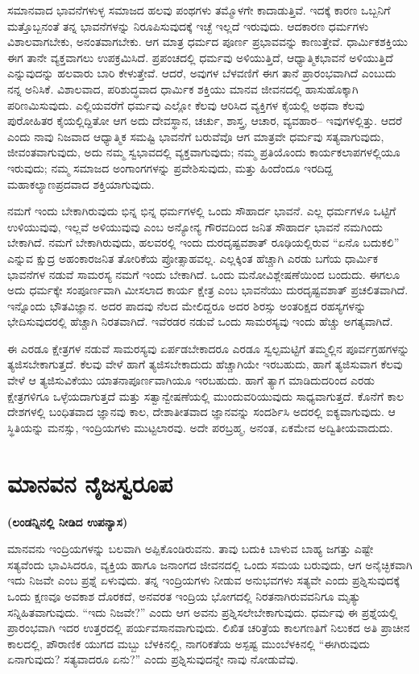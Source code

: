 ಸಮಾನವಾದ ಭಾವನೆಗಳುಳ್ಳ ಸಮಾಜದ ಹಲವು ಪಂಥಗಳು ತಮ್ಮೊಳಗೇ ಕಾದಾಡುತ್ತಿವೆ. ಇದಕ್ಕೆ ಕಾರಣ ಒಬ್ಬನಿಗೆ ಮತ್ತೊಬ್ಬನಂತೆ ತನ್ನ ಭಾವನೆಗಳನ್ನು ನಿರೂಪಿಸುವುದಕ್ಕೆ ಇಚ್ಛೆ ಇಲ್ಲದೆ ಇರುವುದು. ಆದಕಾರಣ ಧರ್ಮಗಳು ವಿಶಾಲವಾಗಬೇಕು, ಅನಂತವಾಗಬೇಕು. ಆಗ ಮಾತ್ರ ಧರ್ಮದ ಪೂರ್ಣ ಪ್ರಭಾವವನ್ನು ಕಾಣುತ್ತೇವೆ. ಧಾರ್ಮಿಕಶಕ್ತಿಯು ಈಗ ತಾನೇ ವ್ಯಕ್ತವಾಗಲು ಉಪಕ್ರಮಿಸಿದೆ. ಪ್ರಪಂಚದಲ್ಲಿ ಧರ್ಮವು ಅಳಿಯುತ್ತಿದೆ, ಆಧ್ಯಾತ್ಮಿಕಭಾವನೆ ಅಳಿಯುತ್ತಿದೆ ಎನ್ನುವುದನ್ನು ಹಲವಾರು ಬಾರಿ ಕೇಳುತ್ತೇವೆ. ಆದರೆ, ಅವುಗಳ ಬೆಳವಣಿಗೆ ಈಗ ತಾನೆ ಪ್ರಾರಂಭವಾಗಿದೆ ಎಂಬುದು ನನ್ನ ಅನಿಸಿಕೆ. ವಿಶಾಲವಾದ, ಪರಿಶುದ್ಧವಾದ ಧಾರ್ಮಿಕ ಶಕ್ತಿಯು ಮಾನವ ಜೀವನದಲ್ಲಿ ಹಾಸುಹೊಕ್ಕಾಗಿ ಪರಿಣಮಿಸುವುದು. ಎಲ್ಲಿಯವರೆಗೆ ಧರ್ಮವು ಎಲ್ಲೋ ಕೆಲವು ಆರಿಸಿದ ವ್ಯಕ್ತಿಗಳ ಕೈಯಲ್ಲಿ ಅಥವಾ ಕೆಲವು ಪುರೋಹಿತರ ಕೈಯಲ್ಲಿದ್ದಿತೋ ಆಗ ಅದು ದೇವಸ್ಥಾನ, ಚರ್ಚು, ಶಾಸ್ತ್ರ, ಆಚಾರ, ವ್ಯವಹಾರ– ಇವುಗಳಲ್ಲಿತ್ತು. ಆದರೆ ಎಂದು ನಾವು ನಿಜವಾದ ಆಧ್ಯಾತ್ಮಿಕ ಸಮಷ್ಟಿ ಭಾವನೆಗೆ ಬರುವೆವೊ ಆಗ ಮಾತ್ರವೇ ಧರ್ಮವು ಸತ್ಯವಾಗುವುದು, ಜೀವಂತವಾಗುವುದು, ಅದು ನಮ್ಮ ಸ್ವಭಾವದಲ್ಲಿ ವ್ಯಕ್ತವಾಗುವುದು; ನಮ್ಮ ಪ್ರತಿಯೊಂದು ಕಾರ್ಯಕಲಾಪಗಳಲ್ಲಿಯೂ ಇರುವುದು; ನಮ್ಮ ಸಮಾಜದ ಅಂಗಾಂಗಗಳನ್ನು ಪ್ರವೇಶಿಸುವುದು, ಮತ್ತು ಹಿಂದೆಂದೂ ಇರದಿದ್ದ ಮಹಾಕಲ್ಯಾಣಪ್ರದವಾದ ಶಕ್ತಿಯಾಗುವುದು.

ನಮಗೆ ಇಂದು ಬೇಕಾಗಿರುವುದು ಭಿನ್ನ ಭಿನ್ನ ಧರ್ಮಗಳಲ್ಲಿ ಒಂದು ಸೌಹಾರ್ದ ಭಾವನೆ. ಎಲ್ಲ ಧರ್ಮಗಳೂ ಒಟ್ಟಿಗೆ ಉಳಿಯುವುವು, ಇಲ್ಲವೆ ಅಳಿಯುವುವು ಎಂಬ ಅನ್ಯೋನ್ಯ ಗೌರವದಿಂದ ಜನಿತ ಸೌಹಾರ್ದ ಭಾವನೆ ನಮಗಿಂದು ಬೇಕಾಗಿದೆ. ನಮಗೆ ಬೇಕಾಗಿರುವುದು, ಹಲವರಲ್ಲಿ ಇಂದು ದುರದೃಷ್ಟವಶಾತ್​ ರೂಢಿಯಲ್ಲಿರುವ “ಏನೊ ಬದುಕಲಿ” ಎನ್ನುವ ಕ್ಷುದ್ರ ಅಹಂಕಾರಜನಿತ ತೋರಿಕೆಯ ಪ್ರೋತ್ಸಾಹವಲ್ಲ. ಎಲ್ಲಕ್ಕಿಂತ ಹೆಚ್ಚಾಗಿ ಎರಡು ಬಗೆಯ ಧಾರ್ಮಿಕ ಭಾವನೆಗಳ ನಡುವೆ ಸಾಮರಸ್ಯ ನಮಗೆ ಇಂದು ಬೇಕಾಗಿದೆ. ಒಂದು ಮನೋವಿಶ್ಲೇಷಣೆಯಿಂದ ಬಂದುದು. ಈಗಲೂ ಅದು ಧರ್ಮಕ್ಕೇ ಸಂಪೂರ್ಣವಾಗಿ ಮೀಸಲಾದ ಕಾರ್ಯ ಕ್ಷೇತ್ರ ಎಂಬ ಭಾವನೆಯು ದುರದೃಷ್ಟವಶಾತ್​ ಪ್ರಚಲಿತವಾಗಿದೆ. ಇನ್ನೊಂದು ಭೌತವಿಜ್ಞಾನ. ಅದರ ಪಾದವು ನೆಲದ ಮೇಲಿದ್ದರೂ ಅದರ ಶಿರಸ್ಸು ಅಂತರಿಕ್ಷದ ರಹಸ್ಯಗಳನ್ನು ಭೇದಿಸುವುದರಲ್ಲಿ ಹೆಚ್ಚಾಗಿ ನಿರತವಾಗಿದೆ. ಇವೆರಡರ ನಡುವೆ ಒಂದು ಸಾಮರಸ್ಯವು ಇಂದು ಹೆಚ್ಚು ಅಗತ್ಯವಾಗಿದೆ.

ಈ ಎರಡೂ ಕ್ಷೇತ್ರಗಳ ನಡುವೆ ಸಾಮರಸ್ಯವು ಏರ್ಪಡಬೇಕಾದರೂ ಎರಡೂ ಸ್ವಲ್ಪಮಟ್ಟಿಗೆ ತಮ್ಮಲ್ಲಿನ ಪೂರ್ವಗ್ರಹಗಳನ್ನು ತ್ಯಜಿಸಬೇಕಾಗುತ್ತದೆ. ಕೆಲವು ವೇಳೆ ಹಾಗೆ ತ್ಯಜಿಸಬೇಕಾದುದು ಹೆಚ್ಚಾಗಿಯೇ ಇರಬಹುದು, ಹಾಗೆ ತ್ಯಜಿಸುವಾಗ ಕೆಲವು ವೇಳೆ ಆ ತ್ಯಜಿಸುವಿಕೆಯು ಯಾತನಾಪೂರ್ಣವಾಗಿಯೂ ಇರಬಹುದು. ಹಾಗೆ ತ್ಯಾಗ ಮಾಡಿದುದರಿಂದ ಎರಡು ಕ್ಷೇತ್ರಗಳಿಗೂ ಒಳ್ಳೆಯದಾಗುತ್ತದೆ ಮತ್ತು ಸತ್ವಾನ್ವೇಷಣೆಯಲ್ಲಿ ಮುಂದುವರಿಯುವುದು ಸಾಧ್ಯವಾಗುತ್ತದೆ. ಕೊನೆಗೆ ಕಾಲ ದೇಶಗಳಲ್ಲಿ ಬಂಧಿತವಾದ ಜ್ಞಾನವು ಕಾಲ, ದೇಶಾತೀತವಾದ ಜ್ಞಾನವನ್ನು ಸಂದರ್ಶಿಸಿ ಅದರಲ್ಲಿ ಐಕ್ಯವಾಗುವುದು. ಆ ಸ್ಥಿತಿಯನ್ನು ಮನಸ್ಸು, ಇಂದ್ರಿಯಗಳು ಮುಟ್ಟಲಾರವು. ಅದೇ ಪರಬ್ರಹ್ಮ, ಅನಂತ, ಏಕಮೇವ ಅದ್ವಿತೀಯವಾದುದು.

\chapter{ಮಾನವನ ನೈಜಸ್ವರೂಪ}

\centerline{\textbf{(ಲಂಡನ್ನಿನಲ್ಲಿ ನೀಡಿದ ಉಪನ್ಯಾಸ)}}

ಮಾನವನು ಇಂದ್ರಿಯಗಳನ್ನು ಬಲವಾಗಿ ಅಪ್ಪಿಕೊಂಡಿರುವನು. ತಾವು ಬದುಕಿ ಬಾಳುವ ಬಾಹ್ಯ ಜಗತ್ತು ಎಷ್ಟೇ ಸತ್ಯವೆಂದು ಭಾವಿಸಿದರೂ, ವ್ಯಕ್ತಿಯ ಹಾಗೂ ಜನಾಂಗದ ಜೀವನದಲ್ಲಿ ಒಂದು ಸಮಯ ಬರುವುದು, ಆಗ ಅನೈಚ್ಛಿಕವಾಗಿ ಇದು ನಿಜವೇ ಎಂಬ ಪ್ರಶ್ನೆ ಏಳುವುದು. ತನ್ನ ಇಂದ್ರಿಯಗಳು ನೀಡುವ ಅನುಭವಗಳು ಸತ್ಯವೇ ಎಂದು ಪ್ರಶ್ನಿಸುವುದಕ್ಕೆ ಒಂದು ಕ್ಷಣವೂ ಅವಕಾಶ ದೊರಕದೆ, ಅನವರತ ಇಂದ್ರಿಯ ಭೋಗದಲ್ಲಿ ನಿರತನಾಗಿರುವವನಿಗೂ ಮೃತ್ಯು ಸನ್ನಿಹಿತವಾಗುವುದು. “ಇದು ನಿಜವೇ?” ಎಂದು ಆಗ ಅವನು ಪ್ರಶ್ನಿಸಲೇಬೇಕಾಗುವುದು. ಧರ್ಮವು ಈ ಪ್ರಶ್ನೆಯಲ್ಲಿ ಪ್ರಾರಂಭವಾಗಿ ಇದರ ಉತ್ತರದಲ್ಲಿ ಪರ್ಯವಸಾನವಾಗುವುದು. ಲಿಖಿತ ಚರಿತ್ರೆಯ ಕಾಲಗಣತಿಗೆ ನಿಲುಕದ ಅತಿ ಪ್ರಾಚೀನ ಕಾಲದಲ್ಲಿ, ಪೌರಾಣಿಕ ಯುಗದ ಮಬ್ಬು ಬೆಳಕಿನಲ್ಲಿ, ನಾಗರಿಕತೆಯ ಅಸ್ಪಷ್ಟ ಮುಂಬೆಳಕಿನಲ್ಲಿ “ಈಗಿರುವುದು ಏನಾಗುವುದು? ಸತ್ಯವಾದರೂ ಏನು?” ಎಂದು ಪ್ರಶ್ನಿಸುವುದನ್ನೇ ನಾವು ನೋಡುವೆವು.

